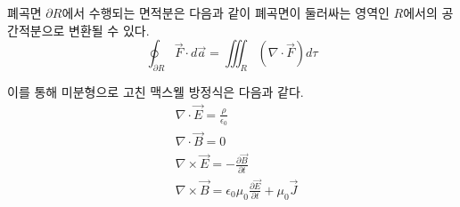 \begin{theorem}[발산 정리]
폐곡면 $\partial R$에서 수행되는 면적분은 다음과 같이 폐곡면이 둘러싸는 영역인 $R$에서의 공간적분으로 변환될 수 있다.
\begin{equation}
\oint_{\partial R} \vec{F}\cdot d\vec{a}=\iiint _R (\nabla \cdot \vec{F}) d\tau
\end{equation}
\end{theorem}
이를 통해 미분형으로 고친 맥스웰 방정식은 다음과 같다.
\begin{align}
&\nabla \cdot \vec{E}=\frac{\rho}{\epsilon_0}\\
&\nabla \cdot \vec{B}=0\\
&\nabla \times \vec{E}=-\frac{\partial \vec{B}}{\partial t}\\
&\nabla \times \vec{B}=\epsilon_0\mu_0\frac{\partial \vec{E}}{\partial t}+\mu_0 \vec{J}\\
\end{align}
